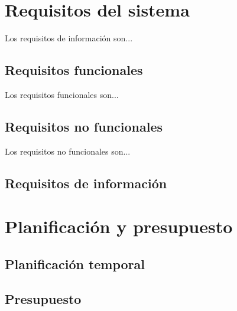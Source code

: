 \section{Requisitos del sistema}
Los requisitos de información son...

\subsection{Requisitos funcionales}
Los requisitos funcionales son...

\subsection{Requisitos no funcionales}
Los requisitos no funcionales son...

\subsection{Requisitos de información}

\section{Planificación y presupuesto}

\subsection{Planificación temporal}

\subsection{Presupuesto}
